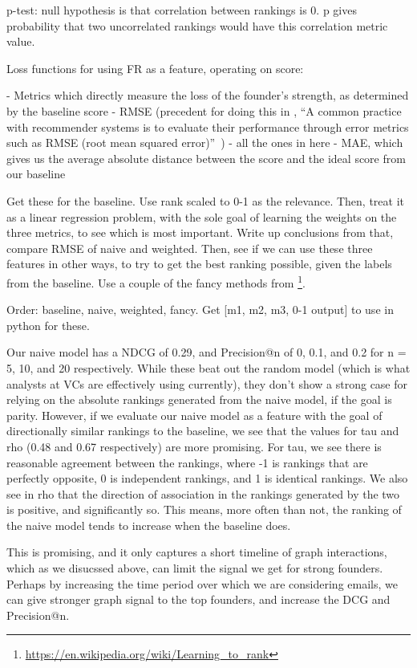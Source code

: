 p-test: null hypothesis is that correlation between rankings is 0. p gives probability that two uncorrelated rankings would have this correlation metric value.

Loss functions for using FR as a feature, operating on score:

- Metrics which directly measure the loss of the founder's strength, as determined by the baseline score
  - RMSE (precedent for doing this in \cite{said2014comparative}, ``A common practice with recommender systems is to evaluate their performance through error metrics such as RMSE (root mean squared error)''~\cite{Cremonesi:2010:PRA:1864708.1864721})
  - all the ones in here \cite{Gunawardana:2009:SAE:1577069.1755883}
  - MAE, which gives us the average absolute distance between the score and the ideal score from our baseline

Get these for the baseline. Use rank scaled to 0-1 as the relevance.
Then, treat it as a linear regression problem, with the sole goal of learning the weights on the three metrics, to see which is most important. Write up conclusions from that, compare RMSE of naive and weighted.
Then, see if we can use these three features in other ways, to try to get the best ranking possible, given the labels from the baseline. Use a couple of the fancy methods from \footnote{\url{https://en.wikipedia.org/wiki/Learning_to_rank}}.

Order: baseline, naive, weighted, fancy.
Get [m1, m2, m3, 0-1 output] to use in python for these.

Our naive model has a NDCG of 0.29, and Precision@n of 0, 0.1, and 0.2 for n = 5, 10, and 20 respectively. While these beat out the random model (which is what analysts at VCs are effectively using currently), they don't show a strong case for relying on the absolute rankings generated from the naive model, if the goal is parity. However, if we evaluate our naive model as a feature with the goal of directionally similar rankings to the baseline, we see that the values for tau and rho (0.48 and 0.67 respectively) are more promising. For tau, we see there is reasonable agreement between the rankings, where -1 is rankings that are perfectly opposite, 0 is independent rankings, and 1 is identical rankings. We also see in rho that the direction of association in the rankings generated by the two is positive, and significantly so. This means, more often than not, the ranking of the naive model tends to increase when the baseline does.

This is promising, and it only captures a short timeline of graph interactions, which as we disucssed above, can limit the signal we get for strong founders. Perhaps by increasing the time period over which we are considering emails, we can give stronger graph signal to the top founders, and increase the DCG and Precision@n.

